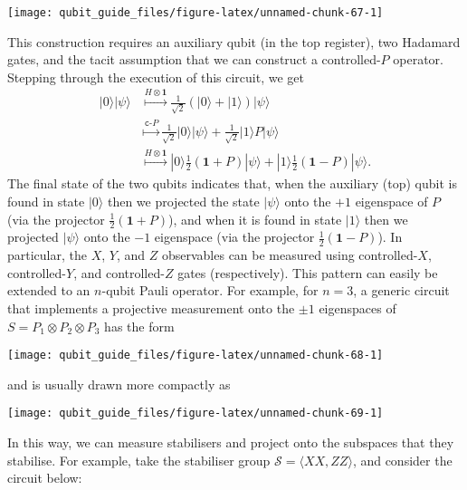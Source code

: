 \documentclass[fleqn]{article}
\begin{document}
\begin{center}\texttt{[image: qubit\_guide\_files/figure-latex/unnamed-chunk-67-1]} \end{center}

This construction requires an auxiliary qubit (in the top register), two Hadamard gates, and the tacit assumption that we can construct a controlled-\(P\) operator.
Stepping through the execution of this circuit, we get
\[
  \begin{aligned}
    |0\rangle|\psi\rangle
    &\overset{H\otimes\mathbf{1}}{\longmapsto}
      \frac{1}{\sqrt{2}}(|0\rangle+|1\rangle)|\psi\rangle
  \\&\overset{\texttt{c-}P}{\longmapsto}
      \frac{1}{\sqrt{2}}|0\rangle|\psi\rangle + \frac{1}{\sqrt{2}}|1\rangle P|\psi\rangle
  \\&\overset{H\otimes\mathbf{1}}{\longmapsto}
      |0\rangle\frac{1}{2}(\mathbf{1}+P)|\psi\rangle + |1\rangle\frac{1}{2}(\mathbf{1}-P)|\psi\rangle.
  \end{aligned}
\]
The final state of the two qubits indicates that, when the auxiliary (top) qubit is found in state \(|0\rangle\) then we projected the state \(|\psi\rangle\) onto the \(+1\) eigenspace of \(P\) (via the projector \(\frac{1}{2}(\mathbf{1}+P)\)), and when it is found in state \(|1\rangle\) then we projected \(|\psi\rangle\) onto the \(-1\) eigenspace (via the projector \(\frac{1}{2}(\mathbf{1}-P)\)).
In particular, the \(X\), \(Y\), and \(Z\) observables can be measured using controlled-\(X\), controlled-\(Y\), and controlled-\(Z\) gates (respectively).
This pattern can easily be extended to an \(n\)-qubit Pauli operator.
For example, for \(n=3\), a generic circuit that implements a projective measurement onto the \(\pm1\) eigenspaces of \(S=P_1\otimes P_2\otimes P_3\) has the form

\begin{center}\texttt{[image: qubit\_guide\_files/figure-latex/unnamed-chunk-68-1]} \end{center}

and is usually drawn more compactly as

\begin{center}\texttt{[image: qubit\_guide\_files/figure-latex/unnamed-chunk-69-1]} \end{center}

In this way, we can measure stabilisers and project onto the subspaces that they stabilise.
For example, take the stabiliser group \(\mathcal{S}=\langle XX,ZZ\rangle\), and consider the circuit below:
\end{document}
